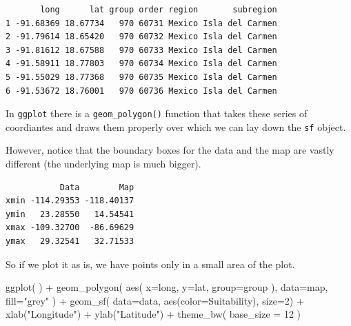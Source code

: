 \documentclass[
  letterpaper,
]{book}
\newenvironment{Shaded}{\begin{snugshade}}{\end{snugshade}}
\newcommand{\AttributeTok}[1]{\textcolor[rgb]{0.40,0.45,0.13}{#1}}
\newcommand{\DecValTok}[1]{\textcolor[rgb]{0.68,0.00,0.00}{#1}}
\newcommand{\FunctionTok}[1]{\textcolor[rgb]{0.28,0.35,0.67}{#1}}
\newcommand{\NormalTok}[1]{\textcolor[rgb]{0.00,0.23,0.31}{#1}}
\newcommand{\SpecialCharTok}[1]{\textcolor[rgb]{0.37,0.37,0.37}{#1}}
\newcommand{\StringTok}[1]{\textcolor[rgb]{0.13,0.47,0.30}{#1}}
\begin{document}
\begin{verbatim}
       long      lat group order region       subregion
1 -91.68369 18.67734   970 60731 Mexico Isla del Carmen
2 -91.79614 18.65420   970 60732 Mexico Isla del Carmen
3 -91.81612 18.67588   970 60733 Mexico Isla del Carmen
4 -91.58911 18.77803   970 60734 Mexico Isla del Carmen
5 -91.55029 18.77368   970 60735 Mexico Isla del Carmen
6 -91.53672 18.76001   970 60736 Mexico Isla del Carmen
\end{verbatim}

In \texttt{ggplot} there is a \texttt{geom\_polygon()} function that
takes these series of coordiantes and draws them properly over which we
can lay down the \texttt{sf} object.

However, notice that the boundary boxes for the data and the map are
vastly different (the underlying map is much bigger).

\begin{Shaded}
\end{Shaded}

\begin{verbatim}
           Data        Map
xmin -114.29353 -118.40137
ymin   23.28550   14.54541
xmax -109.32700  -86.69629
ymax   29.32541   32.71533
\end{verbatim}

So if we plot it as is, we have points only in a small area of the plot.

\begin{Shaded}
\begin{Highlighting}[]
\FunctionTok{ggplot}\NormalTok{( ) }\SpecialCharTok{+} 
  \FunctionTok{geom\_polygon}\NormalTok{( }\FunctionTok{aes}\NormalTok{( }\AttributeTok{x=}\NormalTok{long, }
                     \AttributeTok{y=}\NormalTok{lat, }
                     \AttributeTok{group=}\NormalTok{group ), }
                \AttributeTok{data=}\NormalTok{map, }
                \AttributeTok{fill=}\StringTok{"grey"}\NormalTok{ ) }\SpecialCharTok{+} 
  \FunctionTok{geom\_sf}\NormalTok{( }\AttributeTok{data=}\NormalTok{data, }
           \FunctionTok{aes}\NormalTok{(}\AttributeTok{color=}\NormalTok{Suitability), }
           \AttributeTok{size=}\DecValTok{2}\NormalTok{) }\SpecialCharTok{+}
  \FunctionTok{xlab}\NormalTok{(}\StringTok{"Longitude"}\NormalTok{) }\SpecialCharTok{+} 
  \FunctionTok{ylab}\NormalTok{(}\StringTok{"Latitude"}\NormalTok{) }\SpecialCharTok{+} 
  \FunctionTok{theme\_bw}\NormalTok{( }\AttributeTok{base\_size =} \DecValTok{12}\NormalTok{ ) }
\end{Highlighting}
\end{Shaded}
\end{document}
